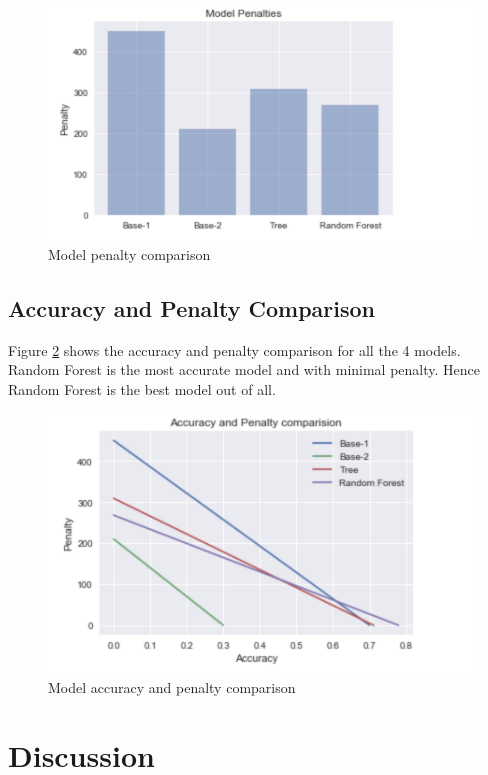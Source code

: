 \documentclass[sigconf]{acmart}
\begin{document}
\begin{figure}[htb]
  \centering
  \includegraphics[width=1.0\columnwidth]{images/Figure24.png}
  \caption{Model penalty comparison}
  \label{fig:Figure24} 
\end{figure}

\subsection{Accuracy and Penalty Comparison} 

Figure \ref{fig:Figure25} shows the accuracy and penalty comparison for all the 4 models. Random Forest is the most accurate model and with minimal penalty. Hence Random Forest is the best model out of all.

\begin{figure}[htb]
  \centering
  \includegraphics[width=1.0\columnwidth]{images/Figure25.png}
  \caption{Model accuracy and penalty comparison}
  \label{fig:Figure25} 
\end{figure}

\section{Discussion}
\end{document}
